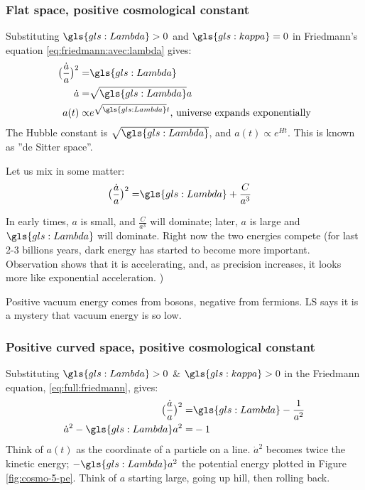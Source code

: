 \documentclass[]{article}
\begin{document}
\subsubsection{Flat space, positive cosmological constant}\label{sec:lambda:pos:k:0}

Substituting  $\gls{gls:Lambda}>0$ and $\gls{gls:kappa}=0$ in Friedmann's equation \eqref{eq:friedmann:avec:lambda} gives:
\begin{align*}
	\big(\frac{\dot{a}}{a}\big)^2  =& \gls{gls:Lambda}\\ 
	\dot{a} =& \sqrt{\gls{gls:Lambda}} a\\
	a(t) \propto& e^{\sqrt{\gls{gls:Lambda}}t} \text{, universe expands exponentially}
\end{align*}
 The Hubble constant is $\sqrt{\gls{gls:Lambda}}$, and $
 a(t) \propto e^{Ht}$. This is known as ''de Sitter space''.
 
 Let us mix in some matter:
 \begin{align*}
 	\big(\frac{\dot{a}}{a}\big)^2  =& \gls{gls:Lambda} + \frac{C}{a^3}
 \end{align*}
 
 In early times, $a$ is small, and $\frac{C}{a^3}$ will dominate; later, $a$ is large and $\gls{gls:Lambda}$ will dominate. Right now the two energies compete (for last 2-3 billions years, dark energy has started to become more important. Observation shows that it is accelerating, and, as precision increases, it looks more like exponential acceleration. )
 
 Positive vacuum energy comes from bosons, negative from fermions. LS says it is a mystery that vacuum energy is so low.
 
 \subsubsection{Positive curved space, positive cosmological constant}\label{sec:lambda:pos:k:1}
 
 Substituting $\gls{gls:Lambda}>0$ \& $\gls{gls:kappa}>0$ in the Friedmann equation, \eqref{eq:full:friedmann}, gives:
 \begin{align*}
 	\big(\frac{\dot{a}}{a}\big)^2  =& \gls{gls:Lambda} - \frac{1}{a^2}\\
 	\dot{a}^2 - \gls{gls:Lambda} a^2 =&-1
 \end{align*}
 Think of $a(t)$ as the coordinate of a particle on a line. $\dot{a}^2$ becomes twice the kinetic energy; $-\gls{gls:Lambda} a^2$ the potential energy plotted in Figure \ref{fig:cosmo-5-pe}. Think of $a$ starting large, going up hill, then rolling back. 
 
\end{document}
